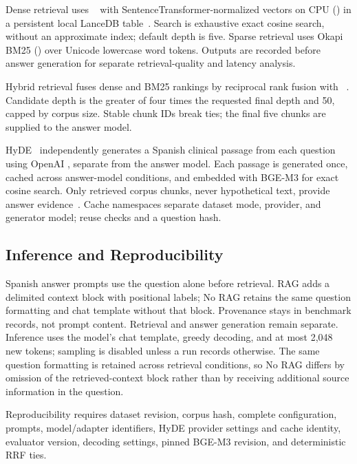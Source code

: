Dense retrieval uses ~\cite{chen2024bge} with
SentenceTransformer-normalized vectors on CPU () in a
persistent local LanceDB table~\cite{lancedb2026vector}. Search is exhaustive
exact cosine search, without an approximate index; default depth is five.
Sparse retrieval uses Okapi BM25 () over Unicode
lowercase word tokens. Outputs are recorded before answer generation for
separate retrieval-quality and latency analysis.

Hybrid retrieval fuses dense and BM25 rankings by reciprocal rank fusion
with ~\cite{cormack2009reciprocal}. Candidate depth
is the greater of four times the requested final depth and 50, capped by
corpus size. Stable chunk IDs break ties; the final five chunks are supplied
to the answer model.

HyDE~\cite{gao2023precise} independently generates a Spanish clinical passage
from each question using OpenAI , separate from
the answer model. Each passage is generated once, cached across answer-model
conditions, and embedded with BGE-M3 for exact cosine search. Only retrieved
corpus chunks, never hypothetical text, provide answer
evidence~\cite{ji2023survey}. Cache namespaces separate dataset mode,
provider, and generator model; reuse checks  and a question hash.

\subsection{Inference and Reproducibility}
Spanish answer prompts use the question alone before retrieval. RAG adds
a delimited context block with positional labels; No RAG retains the same
question formatting and chat template without that block. Provenance stays
in benchmark records, not prompt content. Retrieval and answer generation
remain separate. Inference uses the model's chat template, greedy decoding,
and at most 2,048 new tokens; sampling is disabled unless a run records otherwise.
The same question formatting is retained across retrieval conditions, so
No RAG differs by omission of the retrieved-context block rather than by
receiving additional source information in the question.

Reproducibility requires dataset revision, corpus hash, complete configuration,
prompts, model/adapter identifiers, HyDE provider settings and cache identity,
evaluator version, decoding settings, pinned BGE-M3 revision, and deterministic
RRF ties.

